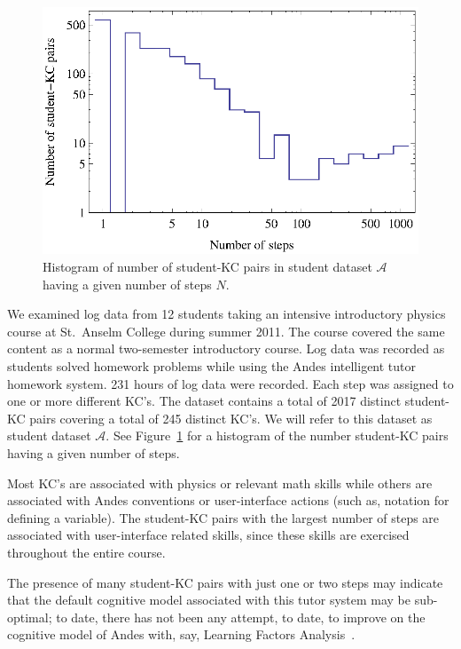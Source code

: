 \documentclass{acmlarge-edm}
\begin{document}
\begin{figure}
  \centering \includegraphics{student-kc-length-histogram.eps}
  \caption{Histogram of number of student-KC pairs in student 
    dataset $\mathcal{A}$ having a given number of steps $N$.}
    \label{student-length-histogram}
\end{figure}

We examined log data from 12 students taking an intensive introductory
physics course at St.\ Anselm College during summer 2011.  The course
covered the same content as a normal two-semester introductory course.
Log data was recorded as students solved homework problems while using
the Andes intelligent tutor homework system.  231 hours of log data
were recorded.
Each step was assigned to one or more different KC's.  The dataset
contains a total of 2017 distinct student-KC pairs covering a total of
245 distinct KC's.  We will refer to this dataset as student dataset
$\mathcal{A}$.  See Figure~\ref{student-length-histogram} for a
histogram of the number student-KC pairs having a given number of
steps.

Most KC's are associated with physics
or relevant math skills while others are associated with 
Andes conventions or user-interface actions (such as, notation
for defining a variable).  The student-KC pairs with the largest 
number of steps are associated with user-interface related skills,
since these skills are exercised throughout the entire course. 

The presence of many student-KC pairs with just one or two
steps may indicate that the default cognitive model associated 
with this tutor system may be sub-optimal; to date, there has not 
been any attempt, to date, to improve on the cognitive model of 
Andes with, say, Learning Factors Analysis~\cite{cen_learning_2006}.
\end{document}
